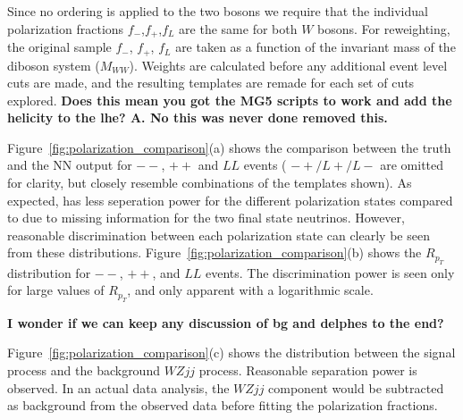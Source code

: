 \normalsize Since no ordering is applied to the two bosons we require
that the individual polarization fractions $f_-$,$f_+$,$f_L$ are the
same for both $W$ bosons.  For reweighting, the original sample $f_-$,
$f_+$, $f_L$ are taken as a function of the invariant mass of the
diboson system ($M_{WW}$).  Weights are calculated before any
additional event level cuts are made, and the resulting templates are
remade for each set of cuts explored.  
{\bf Does this mean you got the
  MG5 scripts to work and add the helicity to the lhe? A. No this was never done removed this.}
 
Figure~\ref{fig:polarization_comparison}(a) shows the comparison between the truth \cts and 
the NN output \ctsNN for $--$, $++$ and $LL$ events ( $-+/L+/L-$ are omitted for clarity, but closely resemble combinations of the templates shown). As expected, \ctsNN has less seperation 
power for the different polarization states compared to \cts due to missing information for the two final state neutrinos. 
However, reasonable discrimination between each polarization state can clearly be seen from these distributions. 
Figure~\ref{fig:polarization_comparison}(b) shows the $R_{p_T}$ distribution for $--$, $++$, and $LL$ events. 
The discrimination power is seen only for large values of $R_{p_T}$, and only apparent with a logarithmic scale.

{\bf I wonder if we can keep any discussion of bg and delphes to the end?}


Figure~\ref{fig:polarization_comparison}(c) shows the \ctsNN
distribution between the signal \ssWW process and the background
$WZjj$ process.  Reasonable separation power is observed. In an actual
data analysis, the $WZjj$ component would be subtracted as background
from the observed data before fitting the polarization fractions.

